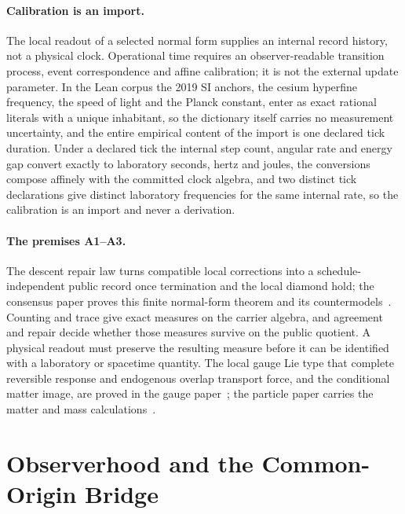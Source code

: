 \documentclass[11pt]{article}
\begin{document}
\paragraph{Calibration is an import.}
The local readout of a selected normal form supplies an internal record
history, not a physical clock. Operational time requires an observer-readable
transition process, event correspondence and affine calibration; it is not
the external update parameter. In the Lean corpus the 2019 SI anchors, the
cesium hyperfine frequency, the speed of light and the Planck constant, enter
as exact rational literals with a unique inhabitant, so the dictionary itself
carries no measurement uncertainty, and the entire empirical content of the
import is one declared tick duration. Under a declared tick the internal step
count, angular rate and energy gap convert exactly to laboratory seconds,
hertz and joules, the conversions compose affinely with the committed clock
algebra, and two distinct tick declarations give distinct laboratory
frequencies for the same internal rate, so the calibration is an import and
never a derivation.

\paragraph{The premises A1--A3.}




The descent repair law turns compatible local corrections into a
schedule-independent public record once termination and the local diamond
hold; the consensus paper proves this finite normal-form theorem and its
countermodels~\cite{ophconsensus}. Counting and trace give exact measures on
the carrier algebra, and agreement and repair decide whether those measures
survive on the public quotient. A physical readout must preserve the
resulting measure before it can be identified with a laboratory or spacetime
quantity. The local gauge Lie type that complete reversible response and
endogenous overlap transport force, and the conditional matter image, are
proved in the gauge paper~\cite{ophGauge}; the particle paper carries the
matter and mass calculations~\cite{ophparticles}.

\section{Observerhood and the Common-Origin Bridge}
\label{sec:observerhood-common-origin}
\end{document}
